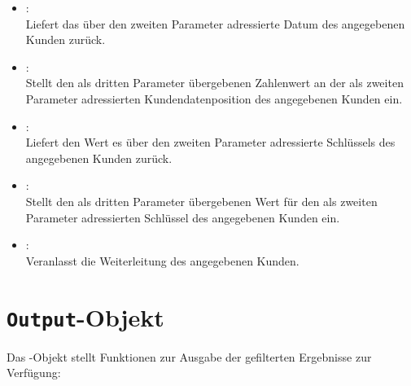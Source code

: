 \begin{itemize}
\item
{}:\\
Liefert das über den zweiten Parameter adressierte Datum des angegebenen Kunden zurück.

\item
{}:\\
Stellt den als dritten Parameter übergebenen Zahlenwert an der als zweiten Parameter adressierten Kundendatenposition des angegebenen Kunden ein.

\item
{}:\\
Liefert den Wert es über den zweiten Parameter adressierte Schlüssels des angegebenen Kunden zurück.

\item
{}:\\
Stellt den als dritten Parameter übergebenen Wert für den als zweiten Parameter adressierten Schlüssel des angegebenen Kunden ein.

\item
{}:\\
Veranlasst die Weiterleitung des angegebenen Kunden.
	
\end{itemize}



\chapter{\texttt{Output}-Objekt}

Das -Objekt stellt Funktionen zur Ausgabe der gefilterten Ergebnisse zur Verfügung:

